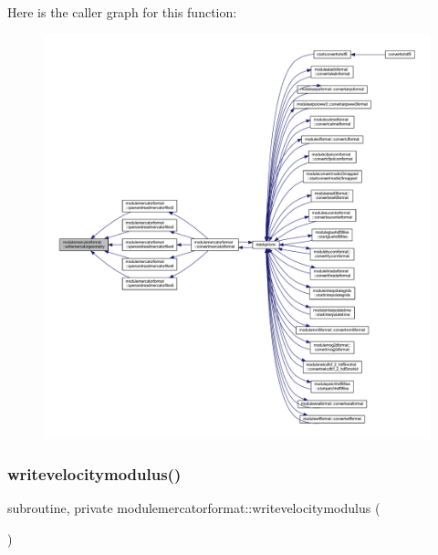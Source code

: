 Here is the caller graph for this function\+:\nopagebreak
\begin{figure}[H]
\begin{center}
\leavevmode
\includegraphics[width=350pt]{namespacemodulemercatorformat_a91963802a12780a4b2d6d09497ba91ac_icgraph}
\end{center}
\end{figure}
\mbox{\label{namespacemodulemercatorformat_a5f3b3ad2a9dc5c613cf6911d366fdc46}} 
\subsubsection{\texorpdfstring{writevelocitymodulus()}{writevelocitymodulus()}}
{\footnotesize\ttfamily subroutine, private modulemercatorformat\+::writevelocitymodulus (\begin{DoxyParamCaption}{ }\end{DoxyParamCaption})\hspace{0.3cm}{\ttfamily [private]}}

